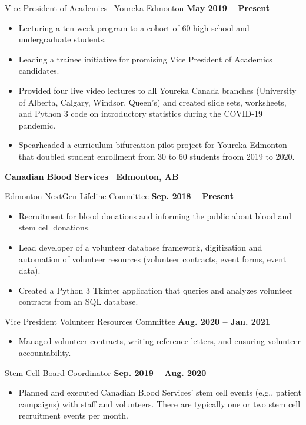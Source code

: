 \documentclass{article}
\begin{document}
    Vice President of Academics \textbar\ Youreka Edmonton \hfill \textbf{May 2019 -- Present}
    \begin{itemize}
        \item Lecturing a ten-week program to a cohort of 60 high school and undergraduate students.
        \item Leading a trainee initiative for promising Vice President of Academics candidates.
        \item Provided four live video lectures to all Youreka Canada branches (University of Alberta, Calgary, Windsor, Queen's) and created slide sets, worksheets, and Python 3 code on introductory statistics during the COVID-19 pandemic.
        \item Spearheaded a curriculum bifurcation pilot project for Youreka Edmonton that doubled student enrollment from 30 to 60 students froom 2019 to 2020.
    \end{itemize}

    \textbf{Canadian Blood Services \textbar\ Edmonton, AB}

    Edmonton NextGen Lifeline Committee \hfill \textbf{Sep. 2018 -- Present}
    \begin{itemize}
        \item Recruitment for blood donations and informing the public about blood and stem cell donations.
        \item Lead developer of a volunteer database framework, digitization and automation of volunteer resources (volunteer contracts, event forms, event data).
        \item Created a Python 3 Tkinter application that queries and analyzes volunteer contracts from an SQL database.
    \end{itemize}

    Vice President Volunteer Resources Committee \hfill \textbf{Aug. 2020 -- Jan. 2021}
    \begin{itemize}
        \item Managed volunteer contracts, writing reference letters, and ensuring volunteer accountability.
    \end{itemize}

    Stem Cell Board Coordinator \hfill \textbf{Sep. 2019 -- Aug. 2020}
    \begin{itemize}
        \item Planned and executed Canadian Blood Services' stem cell events (e.g., patient campaigns) with staff and volunteers. There are typically one or two stem cell recruitment events per month.
    \end{itemize}
\end{document}
